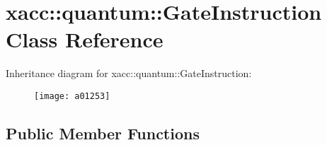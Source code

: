 \hypertarget{a01253}{}\section{xacc\+:\+:quantum\+:\+:Gate\+Instruction Class Reference}
\label{a01253}
Inheritance diagram for xacc\+:\+:quantum\+:\+:Gate\+Instruction\+:\begin{figure}[H]
\begin{center}
\leavevmode
\texttt{[image: a01253]}
\end{center}
\end{figure}
\subsection*{Public Member Functions}
